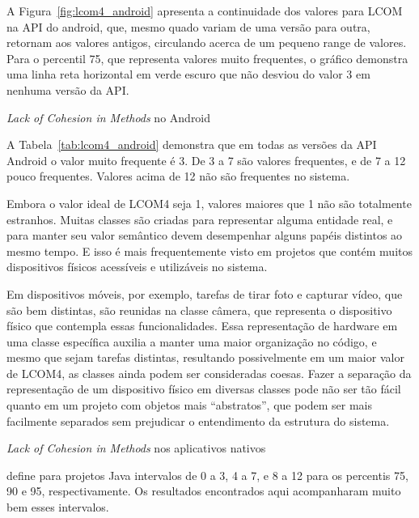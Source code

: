 A Figura~\ref{fig:lcom4_android} apresenta a continuidade dos valores para LCOM na API do android, que, mesmo quado variam de uma versão para outra, retornam aos valores antigos, circulando acerca de um pequeno range de valores. Para o percentil 75, que representa valores muito frequentes, o gráfico demonstra uma linha reta horizontal em verde escuro que não desviou do valor 3 em nenhuma versão da API.

\begin{table}[!htb]
\centering
{}

\caption{\textit{Lack of Cohesion in Methods} no Android}
\label{tab:lcom4_android}
\end{table}

A Tabela~\ref{tab:lcom4_android} demonstra que em todas as versões da API Android o valor muito frequente é 3. De 3 a 7 são valores frequentes, e de 7 a 12 pouco frequentes. Valores acima de 12 não são frequentes no sistema. 

Embora o valor ideal de LCOM4 seja 1, valores maiores que 1 não são totalmente estranhos. Muitas classes são criadas para representar alguma entidade real, e para manter seu valor semântico devem desempenhar alguns papéis distintos ao mesmo tempo. E isso é mais frequentemente visto em projetos que contém muitos dispositivos físicos acessíveis e utilizáveis no sistema. 

Em dispositivos móveis, por exemplo, tarefas de tirar foto e capturar vídeo, que são bem distintas, são reunidas na classe câmera, que representa o dispositivo físico que contempla essas funcionalidades. Essa representação de hardware em uma classe específica auxilia a manter uma maior organização no código, e mesmo que sejam tarefas distintas, resultando possivelmente em um maior valor de LCOM4, as classes ainda podem ser consideradas coesas. Fazer a separação da representação de um dispositivo físico em diversas classes pode não ser tão fácil quanto em um projeto com objetos mais ``abstratos'', que podem ser mais facilmente separados sem prejudicar o entendimento da estrutura do sistema.

\begin{table}[!htb]
\centering
{}

\caption{\textit{Lack of Cohesion in Methods} nos aplicativos nativos}
\label{tab:lcom4_apps}
\end{table}

 define para projetos Java intervalos de 0 a 3, 4 a 7, e 8 a 12 para os percentis 75, 90 e 95, respectivamente. Os resultados encontrados aqui acompanharam muito bem esses intervalos.

